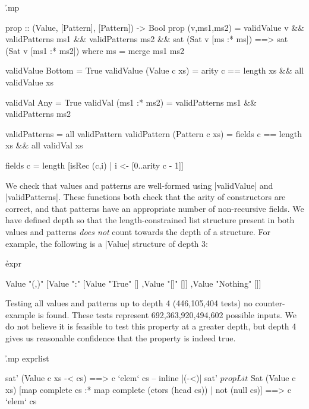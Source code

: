 \h{.mp}\begin{code}
prop :: (Value, [Pattern], [Pattern]) -> Bool
prop (v,ms1,ms2) =
        validValue v && validPatterns ms1 && validPatterns ms2 &&
        sat (Sat v [ms :* ms]) ==> sat (Sat v [ms1 :* ms2])
    where ms = merge ms1 ms2

validValue Bottom        = True
validValue (Value c xs)  = arity c == length xs && all validValue xs

validVal Any           = True
validVal (ms1 :* ms2)  = validPatterns ms1 && validPatterns ms2

validPatterns = all validPattern
validPattern (Pattern c xs) = fields c == length xs && all validVal xs

fields c = length [isRec (c,i) | i <- [0..arity c - 1]]
\end{code}

We check that values and patterns are well-formed using |validValue| and |validPatterns|. These functions both check that the arity of constructors are correct, and that patterns have an appropriate number of non-recursive fields. We have defined depth so that the length-constrained list structure present in both values and patterns \textit{does not} count towards the depth of a structure. For example, the following is a |Value| structure of depth 3:

\h{expr}\begin{code}
Value "(,)"
    [Value ":"
        [Value "True" []
        ,Value "[]" []]
    ,Value "Nothing" []]
\end{code}

Testing all values and patterns up to depth 4 (446,105,404 tests) no counter-example is found. These tests represent 692,363,920,494,602 possible inputs. We do not believe it is feasible to test this property at a greater depth, but depth 4 gives us reasonable confidence that the property is indeed true.



\h{.mp exprlist}\begin{code}
sat' (Value c xs -< cs) ==> c `elem` cs
    -- \eq inline |(-<)|
sat' $ propLit $ Sat (Value c xs)
    [map complete cs :* map complete (ctors (head cs)) | not (null cs)] ==> c `elem` cs
\end{code}


